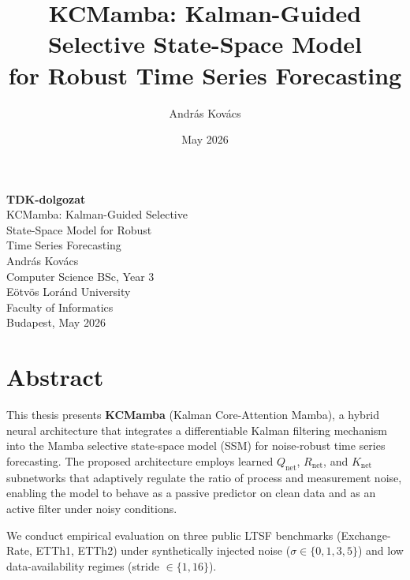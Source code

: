 \documentclass[
]{elteikthesis}[2024/04/26]
\title{KCMamba: Kalman-Guided Selective State-Space Model\\
       for Robust Time Series Forecasting}
\date{May 2026}
\author{András Kovács}
\affiliation{lecturer}
\begin{document}


\begin{titlepage}
    \vspace*{\fill}
    \begin{center}
        {\Huge\bfseries TDK-dolgozat}\\[2.5cm]
        {\LARGE KCMamba: Kalman-Guided Selective\\[0.4em]
                State-Space Model for Robust\\[0.4em]
                Time Series Forecasting}\\[3cm]
        {\Large András Kovács}\\[0.5cm]
        {\large Computer Science BSc, Year 3}\\[2cm]
        {\large Eötvös Loránd University\\[0.3em]
                Faculty of Informatics}\\[0.8cm]
        {\large Budapest, May 2026}
    \end{center}
    \vspace*{\fill}
\end{titlepage}

\maketitle

\chapter*{Abstract}

This thesis presents \textbf{KCMamba} (Kalman Core-Attention Mamba),
a hybrid neural architecture that integrates a differentiable Kalman filtering
mechanism into the Mamba selective state-space model (SSM) for noise-robust
time series forecasting. The proposed architecture employs learned
$Q_\text{net}$, $R_\text{net}$, and $K_\text{net}$ subnetworks that adaptively
regulate the ratio of process and measurement noise, enabling the model to
behave as a passive predictor on clean data and as an active filter under noisy
conditions.

We conduct empirical evaluation on three public LTSF benchmarks
(Exchange-Rate, ETTh1, ETTh2) under synthetically injected noise
($\sigma \in \{0, 1, 3, 5\}$) and low data-availability regimes
(stride $\in \{1, 16\}$).
\end{document}
